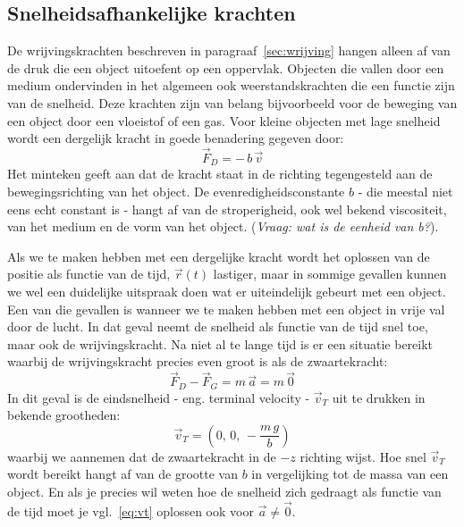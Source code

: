 \subsection{Snelheidsafhankelijke krachten}

De wrijvingskrachten beschreven in paragraaf~\ref{sec:wrijving} hangen alleen af van
de druk die een object uitoefent op een oppervlak. Objecten die vallen door een medium
ondervinden in het algemeen ook weerstandskrachten die een functie zijn van de snelheid. 
Deze krachten zijn van belang bijvoorbeeld voor de beweging
van een object door een vloeistof of een gas. Voor kleine objecten met lage 
snelheid wordt een dergelijk kracht in goede benadering gegeven door:
\begin{equation}\label{eq:drag}
\vec{F}_D = - \, b\,\vec{v}
\end{equation}
Het minteken geeft aan dat de kracht staat in de richting tegengesteld aan de 
bewegingsrichting van het object. De evenredigheidsconstante $b$ - die meestal
niet eens echt constant is - hangt af
van de stroperigheid, ook wel bekend viscositeit, van het medium en de vorm van het object.
({\it Vraag: wat is de eenheid van b?}). 

Als we te maken hebben met een dergelijke kracht wordt het oplossen van de positie als
functie van de tijd, $\vec{r}(t)$ lastiger, maar in sommige gevallen kunnen we wel een duidelijke
uitspraak doen wat er uiteindelijk gebeurt met een object. Een van die gevallen is wanneer
we te maken hebben met een object in vrije val door de lucht. In dat geval neemt de snelheid
als functie van de tijd snel toe, maar ook de wrijvingskracht. Na niet al te lange tijd
is er een situatie bereikt waarbij de wrijvingskracht precies even groot is als de zwaartekracht:
\begin{equation}\label{eq:vt}
\vec{F}_D - \vec{F}_G = m \, \vec{a} = m\,\vec{0}
\end{equation}
In dit geval is de eindsnelheid - eng. terminal velocity - $\vec{v}_T$ uit te drukken in bekende
grootheden:
\begin{equation}
\vec{v}_T = (0,\,0,\,-\frac{m\,g}{b})
\end{equation}
waarbij we aannemen dat de zwaartekracht in de $-z$ richting wijst. Hoe snel $\vec{v}_T$ wordt
bereikt hangt af van de grootte van $b$ in vergelijking tot de massa van een object. En als je
precies wil weten hoe de snelheid zich gedraagt als functie van de tijd moet je vgl.~\ref{eq:vt}
oplossen ook voor $\vec{a}\neq\vec{0}$.

